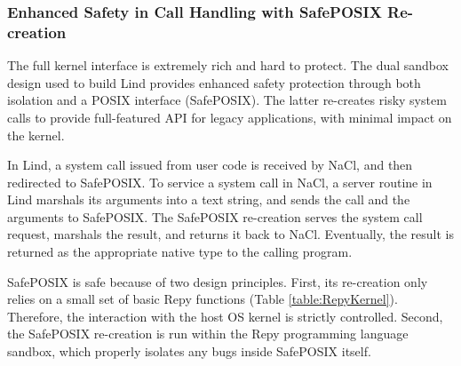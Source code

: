 {\subsubsection{Enhanced Safety in Call Handling with SafePOSIX Re-creation}

The full kernel interface is extremely rich and hard to protect.
The dual sandbox \lip design used to build Lind provides enhanced
safety protection through both isolation and a POSIX interface (SafePOSIX). The
latter re-creates risky system calls to
provide full-featured API for legacy applications, with minimal impact on the kernel.

In Lind, a system call issued from user code is
received by NaCl, and then redirected to SafePOSIX.
To service a system call in NaCl, a server routine in
Lind marshals its arguments into a text string, and sends the call and the arguments
to SafePOSIX. The SafePOSIX re-creation serves the system call request, marshals the result, and
returns it back to NaCl. Eventually, the result is returned as the appropriate
native type to the calling program.

SafePOSIX is safe because of two design principles.
First, its re-creation only relies on a small set of basic Repy functions (Table \ref{table:RepyKernel}).
Therefore, the interaction with the host OS kernel is strictly controlled.
Second, the SafePOSIX re-creation is run within the Repy programming language sandbox,
which properly isolates any bugs inside SafePOSIX itself.



}
